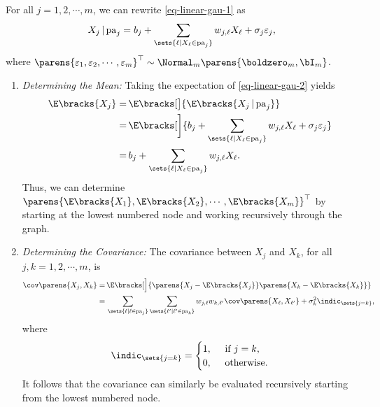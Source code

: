 \documentclass[12pt]{article}
\begin{document}
\begin{enumerate}[label=\textbf{\arabic*.}]
	For all $j = 1, 2, \cdots, m$, we can rewrite \eqref{eq-linear-gau-1} as 
	\begin{align}\label{eq-linear-gau-2}
		X_j \,\vert\, \mathrm{pa}_j = b_j + \sum_{\sets{\ell \vert X_\ell \in \mathrm{pa}_j}} w_{j, \ell} X_{\ell} + \sigma_j \varepsilon_j, 
	\end{align}
	where $\parens{\varepsilon_1, \varepsilon_2, \cdots, \varepsilon_m}^\top \sim \Normal_m \parens{\boldzero_m, \bI_m}$. 
	\begin{enumerate}
		\item \textit{Determining the Mean:} Taking the expectation of \eqref{eq-linear-gau-2} yields 
		\begin{align*}
			\E \bracks{X_j} = & \, \E \bracks[\big]{\E \bracks{X_j \,\vert\, \mathrm{pa}_j}} \\ 
			= & \, \E \bracks[\bigg]{b_j + \sum_{\sets{\ell \vert X_\ell \in \mathrm{pa}_j}} w_{j, \ell} X_{\ell} + \sigma_j \varepsilon_j} \\ 
			= & \, b_j + \sum_{\sets{\ell \vert X_\ell \in \mathrm{pa}_j}} w_{j, \ell} X_{\ell}. 
		\end{align*}
		Thus, we can determine $\parens{\E \bracks{X_1}, \E \bracks{X_2}, \cdots, \E \bracks{X_m}}^\top$ by starting at the lowest numbered node and working recursively through the graph. 
		
		\item \textit{Determining the Covariance:} The covariance between $X_j$ and $X_k$, for all $j, k = 1, 2, \cdots, m$, is 
		\begin{align*}
			\cov \parens{X_j, X_k} = & \, \E \bracks[\Big]{\parens{X_j - \E \bracks{X_j}} \parens{X_k - \E \bracks{X_k}}} \\ 
			= & \, \sum_{\sets{\ell \vert \ell \in \mathrm{pa}_j}} \sum_{\sets{\ell' \vert \ell' \in \mathrm{pa}_k}} w_{j, \ell} w_{k, \ell'} \cov \parens{X_{\ell}, X_{\ell'}} + \sigma_k^2 \indic_{\sets{j = k}}, 
		\end{align*}
		where 
		\begin{align*}
			\indic_{\sets{j = k}} = \begin{cases}
				1, & \, \text{ if } j = k, \\ 
				0, & \, \text{ otherwise}. 
			\end{cases}
		\end{align*}
		It follows that the covariance can similarly be evaluated recursively starting from the lowest numbered node. 
	\end{enumerate}
	

\end{enumerate}
\end{document}
